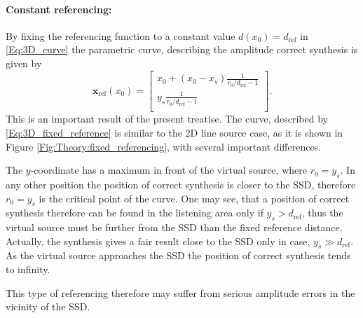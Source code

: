 \documentclass[12pt,a4paper]{article}
\newcommand{\dref}{d_{\mathrm{ref}}}
\begin{document}
\paragraph{Constant referencing:\\}
By fixing the referencing function to a constant value $d(x_0) = \dref$ in \eqref{Eq:3D_curve} the parametric curve, describing the amplitude correct synthesis is given by
\begin{equation}
\mathbf{x}_{\mathrm{ref}}(x_0)  =  \begin{bmatrix} x_0 + (x_0-x_s)\frac{1}{r_0/\dref - 1 } \\[0.3em] y_s \frac{1}{r_0/\dref - 1}\\[0.3em]    \end{bmatrix}.
\label{Eq:3D_fixed_reference}
\end{equation}
This is an important result of the present treatise. The curve, described by \eqref{Eq:3D_fixed_reference} is similar to the 2D line source case, as it is shown in Figure \ref{Fig:Theory:fixed_referencing}, with several important differences.

The $y$-coordinate has a maximum in front of the virtual source, where $r_0 = y_s$. In any other position the position of correct synthesis is closer to the SSD, therefore $r_0 = y_s$ is the critical point of the curve. One may see, that a position of correct synthesis therefore can be found in the listening area only if $y_s > \dref$, thus the virtual source must be further from the SSD than the fixed reference distance. Actually, the synthesis gives a fair result close to the SSD only in case, $y_s \gg \dref$. As the virtual source approaches the SSD the position of correct synthesis tends to infinity.

This type of referencing therefore may suffer from serious amplitude errors in the vicinity of the SSD.
\end{document}
